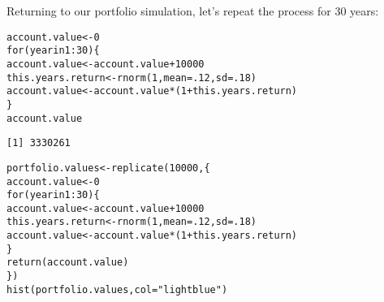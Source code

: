 \documentclass{beamer}\usepackage[]{graphicx}\usepackage[]{color}
\makeatletter
\newcommand{\hlnum}[1]{\textcolor[rgb]{0.824,0.412,0.118}{#1}}%
\newcommand{\hlstr}[1]{\textcolor[rgb]{1,0.894,0.71}{#1}}%
\newcommand{\hlopt}[1]{\textcolor[rgb]{1,0.894,0.769}{#1}}%
\newcommand{\hlstd}[1]{\textcolor[rgb]{1,0.894,0.769}{#1}}%
\newcommand{\hlkwa}[1]{\textcolor[rgb]{0.941,0.902,0.549}{#1}}%
\newcommand{\hlkwb}[1]{\textcolor[rgb]{0.804,0.776,0.451}{#1}}%
\newcommand{\hlkwc}[1]{\textcolor[rgb]{0.78,0.941,0.545}{#1}}%
\newcommand{\hlkwd}[1]{\textcolor[rgb]{1,0.78,0.769}{#1}}%
\newenvironment{kframe}{%
 \def\at@end@of@kframe{}%
 \ifinner\ifhmode%
  \def\at@end@of@kframe{\end{minipage}}%
  \begin{minipage}{\columnwidth}%
 \fi\fi%
 \def\FrameCommand##1{\hskip\@totalleftmargin \hskip-\fboxsep
 \colorbox{shadecolor}{##1}\hskip-\fboxsep
     \hskip-\linewidth \hskip-\@totalleftmargin \hskip\columnwidth}%
 \MakeFramed {\advance\hsize-\width
   \@totalleftmargin\z@ \linewidth\hsize
   \@setminipage}}%
 {\par\unskip\endMakeFramed%
 \at@end@of@kframe}
\newenvironment{knitrout}{}{} %
\makeatother
\begin{document}
\begin{darkframes}
    \begin{frame}[fragile]
      Returning to our portfolio simulation, let's repeat the process for 30 years:
      \fontsm
\begin{knitrout}
\begin{kframe}
\begin{alltt}
\hlstd{account.value} \hlkwb{<-} \hlnum{0}
\hlkwa{for} \hlstd{(year} \hlkwa{in} \hlnum{1}\hlopt{:}\hlnum{30}\hlstd{) \{}
  \hlstd{account.value} \hlkwb{<-} \hlstd{account.value} \hlopt{+} \hlnum{10000}
  \hlstd{this.years.return} \hlkwb{<-} \hlkwd{rnorm}\hlstd{(}\hlnum{1}\hlstd{,} \hlkwc{mean}\hlstd{=}\hlnum{.12}\hlstd{,} \hlkwc{sd}\hlstd{=}\hlnum{.18}\hlstd{)}
  \hlstd{account.value} \hlkwb{<-} \hlstd{account.value} \hlopt{*} \hlstd{(}\hlnum{1} \hlopt{+} \hlstd{this.years.return)}
\hlstd{\}}
\hlstd{account.value}
\end{alltt}
\begin{verbatim}
[1] 3330261
\end{verbatim}
\end{kframe}
\end{knitrout}
    \end{frame}

    \begin{frame}[fragile]
      \fontsize{9}{9}\selectfont
\begin{knitrout}
\begin{kframe}
\begin{alltt}
\hlstd{portfolio.values} \hlkwb{<-} \hlkwd{replicate}\hlstd{(}\hlnum{10000}\hlstd{, \{}
  \hlstd{account.value} \hlkwb{<-} \hlnum{0}
  \hlkwa{for} \hlstd{(year} \hlkwa{in} \hlnum{1}\hlopt{:}\hlnum{30}\hlstd{) \{}
    \hlstd{account.value} \hlkwb{<-} \hlstd{account.value} \hlopt{+} \hlnum{10000}
    \hlstd{this.years.return} \hlkwb{<-} \hlkwd{rnorm}\hlstd{(}\hlnum{1}\hlstd{,} \hlkwc{mean}\hlstd{=}\hlnum{.12}\hlstd{,} \hlkwc{sd}\hlstd{=}\hlnum{.18}\hlstd{)}
    \hlstd{account.value} \hlkwb{<-} \hlstd{account.value} \hlopt{*} \hlstd{(}\hlnum{1} \hlopt{+} \hlstd{this.years.return)}
  \hlstd{\}}
  \hlkwd{return}\hlstd{(account.value)}
\hlstd{\})}
\hlkwd{hist}\hlstd{(portfolio.values,} \hlkwc{col}\hlstd{=}\hlstr{"lightblue"}\hlstd{)}
\end{alltt}
\end{kframe}


\end{knitrout}
      \lc
    \end{frame}


\end{darkframes}
\end{document}
